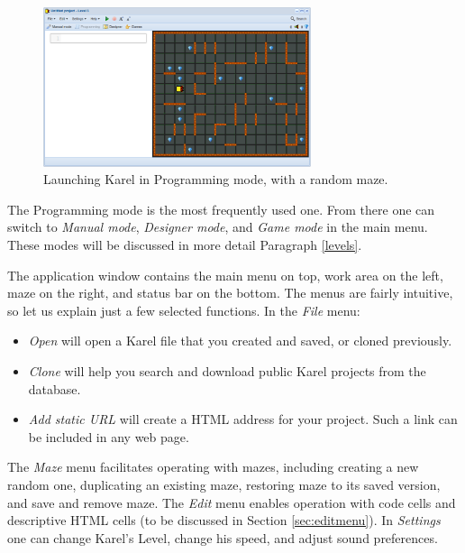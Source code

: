 \begin{figure}[!ht]
\begin{center}
\includegraphics[width=0.7\textwidth]{img/init.png}
\end{center}
\vspace{-2mm}
\caption{Launching Karel in Programming mode, with a random maze.}
\label{fig:init}
\end{figure}

\noindent
The Programming mode is the most frequently used one. From there one can 
switch to {\em Manual mode}, {\em Designer mode}, and {\em Game mode} in 
the main menu. These modes will be discussed in more detail Paragraph \ref{levels}.

The application window contains the main menu on top,
work area on the left, maze on the right, and status bar on the bottom.
The menus are fairly intuitive, so let us explain just a few selected 
functions. In the {\em File} menu:

\begin{itemize}
\item {\em Open} will open a Karel file that you created and saved, or cloned previously.
\item {\em Clone} will help you search and download public Karel projects from the database. 
\item {\em Add static URL} will create a HTML address for your project. Such a link can be 
      included in any web page. 
\end{itemize}
The {\em Maze} menu facilitates operating with mazes, including creating a new random 
one, duplicating an existing maze, restoring maze to its saved version, and save and remove 
maze. The {\em Edit} menu enables operation with code cells and descriptive HTML cells (to be discussed in 
Section \ref{sec:editmenu}). In {\em Settings} one can change Karel's Level, change his 
speed, and adjust sound preferences. 

